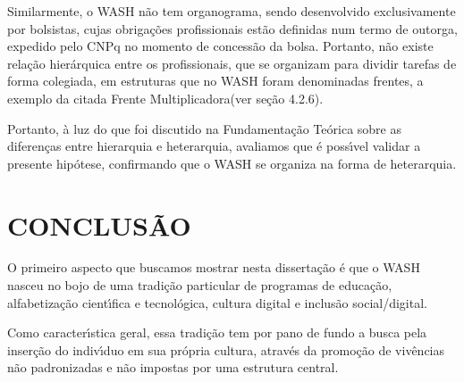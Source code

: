 \documentclass[
12pt,		%
openright,	%
twoside,  %
a4paper,			%
chapter=TITLE,		%
english,			%
french,				%
spanish,			%
brazil				%
]{USPSC-classe/USPSC}
\begin{document}
Similarmente, o WASH n\~ao tem organograma, sendo desenvolvido exclusivamente por bolsistas, cujas obriga\c{c}\~oes profissionais est\~ao definidas num termo de outorga, expedido pelo CNPq no momento de concess\~ao da bolsa. Portanto, n\~ao existe rela\c{c}\~ao hier\'arquica entre os profissionais, que se organizam para dividir tarefas de forma colegiada, em estruturas que no WASH foram denominadas \textquotedbl frentes\textquotedbl , a exemplo da citada \textquotedbl Frente Multiplicadora\textquotedbl  (ver se\c{c}\~ao 4.2.6).

















Portanto, \`a luz do que foi discutido na Fundamenta\c{c}\~ao Te\'orica sobre as diferen\c{c}as entre hierarquia e heterarquia, avaliamos que \'e poss\'{\i}vel validar a presente hip\'otese, confirmando que o WASH se organiza na forma de heterarquia.

















\chapter[CONCLUS\~AO]{CONCLUS\~AO}\label{CONCLUS\~AO}
O primeiro aspecto que buscamos mostrar nesta disserta\c{c}\~ao \'e que o WASH nasceu no bojo de uma tradi\c{c}\~ao particular de programas de educa\c{c}\~ao, alfabetiza\c{c}\~ao cient\'{\i}fica e tecnol\'ogica, cultura digital e inclus\~ao social/digital.

















Como caracter\'{\i}stica geral, essa tradi\c{c}\~ao tem por pano de fundo a busca pela inser\c{c}\~ao do indiv\'{\i}duo em sua pr\'opria cultura, atrav\'es da promo\c{c}\~ao de viv\^encias n\~ao padronizadas e n\~ao impostas por uma estrutura central.
\end{document}
